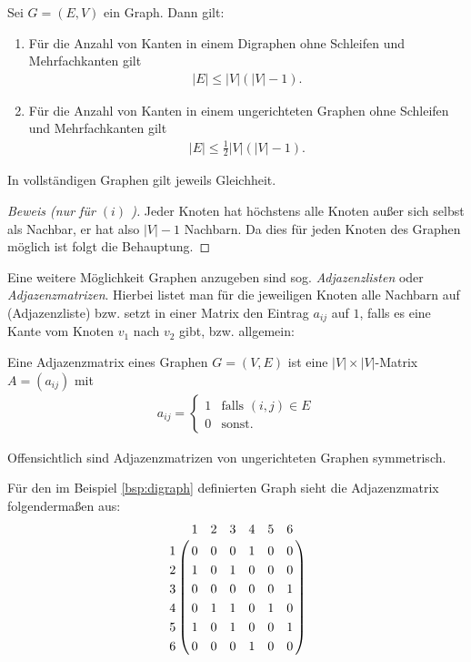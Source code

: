 \begin{proposition}
	Sei $G=(E, V)$ ein Graph. Dann gilt:
	\begin{enumerate}[label=(\roman*)]
		\item Für die Anzahl von Kanten in einem Digraphen ohne Schleifen und Mehrfachkanten gilt
		      \begin{gather*}
			      |E| \le |V|(|V| - 1).
		      \end{gather*}

		\item Für die Anzahl von Kanten in einem ungerichteten Graphen ohne Schleifen und Mehrfachkanten gilt
		      \begin{gather*}
			      |E| \le \frac{1}{2} |V|(|V| - 1).
		      \end{gather*}
	\end{enumerate}
	In vollständigen Graphen gilt jeweils Gleichheit.
\end{proposition}

\begin{proof}[Beweis (nur für $(i)$ )]
	Jeder Knoten hat höchstens alle Knoten außer sich selbst als Nachbar, er hat also $|V| - 1$ Nachbarn. Da dies für jeden Knoten des Graphen möglich ist folgt die Behauptung.
\end{proof}

Eine weitere Möglichkeit Graphen anzugeben sind sog. \emph{Adjazenzlisten} oder \emph{Adjazenzmatrizen}. Hierbei listet man für die jeweiligen Knoten alle Nachbarn auf (Adjazenzliste) bzw. setzt in einer Matrix den Eintrag $a_{ij}$ auf $1$, falls es eine Kante vom Knoten $v_1$ nach $v_2$ gibt, bzw. allgemein:
\begin{defi}[Adjazenzmatrix]
	Eine Adjazenzmatrix eines Graphen $G=(V,E)$ ist eine $|V| \times |V|$-Matrix $A = (a_{ij})$ mit
	\begin{gather*}
		a_{ij} = \begin{cases}
			1 & \text{falls } (i,j) \in E \\
			0 & \text{sonst.}
		\end{cases}
	\end{gather*}
\end{defi}

\begin{anm}
	Offensichtlich sind Adjazenzmatrizen von ungerichteten Graphen symmetrisch.
\end{anm}

Für den im Beispiel \ref{bsp:digraph} definierten Graph sieht die Adjazenzmatrix folgendermaßen aus:
\begin{gather*}
	\bordermatrix{
		& 1 & 2 & 3 & 4 & 5 & 6 \cr
		1 & 0 & 0 & 0 & 1 & 0 & 0 \cr
		2 & 1 & 0 & 1 & 0 & 0 & 0 \cr
		3 & 0 & 0 & 0 & 0 & 0 & 1 \cr
		4 & 0 & 1 & 1 & 0 & 1 & 0 \cr
		5 & 1 & 0 & 1 & 0 & 0 & 1 \cr
		6 & 0 & 0 & 0 & 1 & 0 & 0 \cr
	}
\end{gather*}

